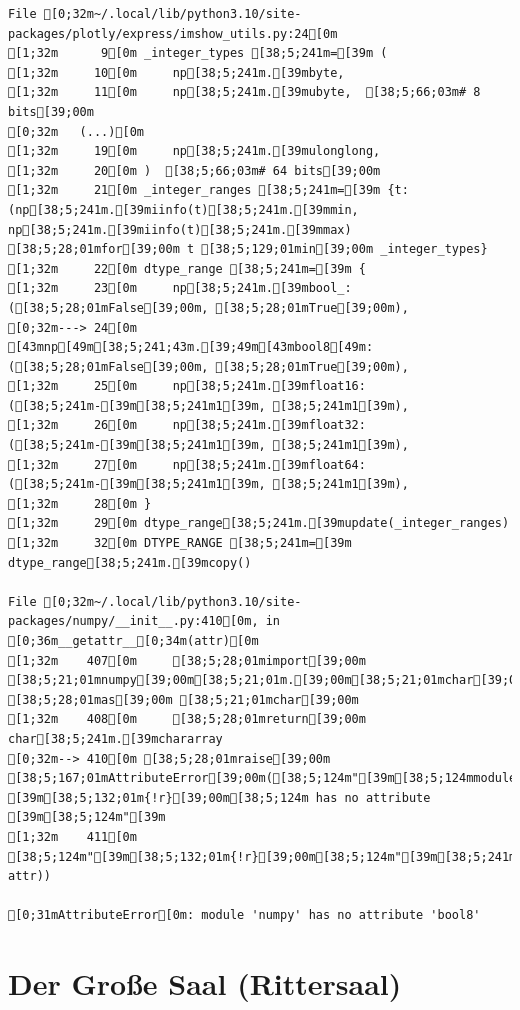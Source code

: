 \documentclass[
  letterpaper,
]{book}
\begin{document}
\begin{verbatim}
File [0;32m~/.local/lib/python3.10/site-packages/plotly/express/imshow_utils.py:24[0m
[1;32m      9[0m _integer_types [38;5;241m=[39m (
[1;32m     10[0m     np[38;5;241m.[39mbyte,
[1;32m     11[0m     np[38;5;241m.[39mubyte,  [38;5;66;03m# 8 bits[39;00m
[0;32m   (...)[0m
[1;32m     19[0m     np[38;5;241m.[39mulonglong,
[1;32m     20[0m )  [38;5;66;03m# 64 bits[39;00m
[1;32m     21[0m _integer_ranges [38;5;241m=[39m {t: (np[38;5;241m.[39miinfo(t)[38;5;241m.[39mmin, np[38;5;241m.[39miinfo(t)[38;5;241m.[39mmax) [38;5;28;01mfor[39;00m t [38;5;129;01min[39;00m _integer_types}
[1;32m     22[0m dtype_range [38;5;241m=[39m {
[1;32m     23[0m     np[38;5;241m.[39mbool_: ([38;5;28;01mFalse[39;00m, [38;5;28;01mTrue[39;00m),
[0;32m---> 24[0m     [43mnp[49m[38;5;241;43m.[39;49m[43mbool8[49m: ([38;5;28;01mFalse[39;00m, [38;5;28;01mTrue[39;00m),
[1;32m     25[0m     np[38;5;241m.[39mfloat16: ([38;5;241m-[39m[38;5;241m1[39m, [38;5;241m1[39m),
[1;32m     26[0m     np[38;5;241m.[39mfloat32: ([38;5;241m-[39m[38;5;241m1[39m, [38;5;241m1[39m),
[1;32m     27[0m     np[38;5;241m.[39mfloat64: ([38;5;241m-[39m[38;5;241m1[39m, [38;5;241m1[39m),
[1;32m     28[0m }
[1;32m     29[0m dtype_range[38;5;241m.[39mupdate(_integer_ranges)
[1;32m     32[0m DTYPE_RANGE [38;5;241m=[39m dtype_range[38;5;241m.[39mcopy()

File [0;32m~/.local/lib/python3.10/site-packages/numpy/__init__.py:410[0m, in [0;36m__getattr__[0;34m(attr)[0m
[1;32m    407[0m     [38;5;28;01mimport[39;00m [38;5;21;01mnumpy[39;00m[38;5;21;01m.[39;00m[38;5;21;01mchar[39;00m [38;5;28;01mas[39;00m [38;5;21;01mchar[39;00m
[1;32m    408[0m     [38;5;28;01mreturn[39;00m char[38;5;241m.[39mchararray
[0;32m--> 410[0m [38;5;28;01mraise[39;00m [38;5;167;01mAttributeError[39;00m([38;5;124m"[39m[38;5;124mmodule [39m[38;5;132;01m{!r}[39;00m[38;5;124m has no attribute [39m[38;5;124m"[39m
[1;32m    411[0m                      [38;5;124m"[39m[38;5;132;01m{!r}[39;00m[38;5;124m"[39m[38;5;241m.[39mformat([38;5;18m__name__[39m, attr))

[0;31mAttributeError[0m: module 'numpy' has no attribute 'bool8'
\end{verbatim}


\chapter{Der Große Saal
(Rittersaal)}\label{der-grouxdfe-saal-rittersaal}
\end{document}
